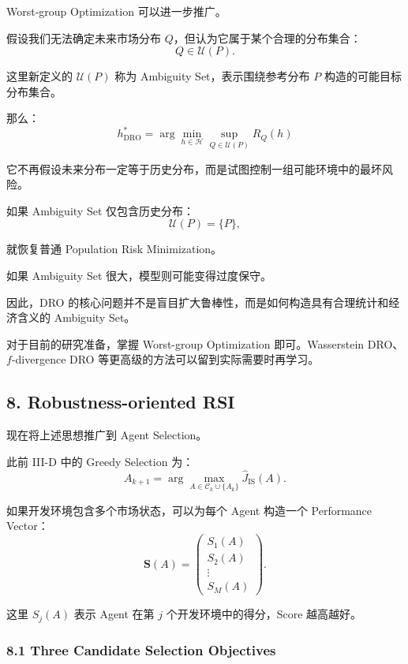 Worst-group Optimization 可以进一步推广。

假设我们无法确定未来市场分布 \(Q\)，但认为它属于某个合理的分布集合：
\[Q\in\mathcal U(P).\]

这里新定义的 \(\mathcal U(P)\) 称为 Ambiguity Set，表示围绕参考分布 \(P\) 构造的可能目标分布集合。

那么：
\[\boxed{
h_{\mathrm{DRO}}^*
=
\arg\min_{h\in\mathcal H}
\sup_{Q\in\mathcal U(P)}
R_Q(h)
}\]

它不再假设未来分布一定等于历史分布，而是试图控制一组可能环境中的最坏风险。

如果 Ambiguity Set 仅包含历史分布：
\[\mathcal U(P)=\{P\},\]

就恢复普通 Population Risk Minimization。

如果 Ambiguity Set 很大，模型则可能变得过度保守。

因此，DRO 的核心问题并不是盲目扩大鲁棒性，而是如何构造具有合理统计和经济含义的 Ambiguity Set。

对于目前的研究准备，掌握 Worst-group Optimization 即可。Wasserstein DRO、\(f\)-divergence DRO 等更高级的方法可以留到实际需要时再学习。

\hypertarget{part-4-77-0001-robustness-oriented-rsi}{%
\subsection{8. Robustness-oriented RSI}\label{part-4-77-0001-robustness-oriented-rsi}}

现在将上述思想推广到 Agent Selection。

此前 III-D 中的 Greedy Selection 为：
\[A_{k+1}
=
\arg\max_{A\in\mathcal C_k\cup\{A_k\}}
\widehat J_{\mathrm{IS}}(A).\]

如果开发环境包含多个市场状态，可以为每个 Agent 构造一个 Performance Vector：
\[\boldsymbol S(A)
=
\begin{pmatrix}
S_1(A)\\
S_2(A)\\
\vdots\\
S_M(A)
\end{pmatrix}.\]

这里 \(S_j(A)\) 表示 Agent 在第 \(j\) 个开发环境中的得分，Score 越高越好。

\hypertarget{part-4-77-0001-three-candidate-selection-objectives}{%
\subsubsection{8.1 Three Candidate Selection Objectives}\label{part-4-77-0001-three-candidate-selection-objectives}}

